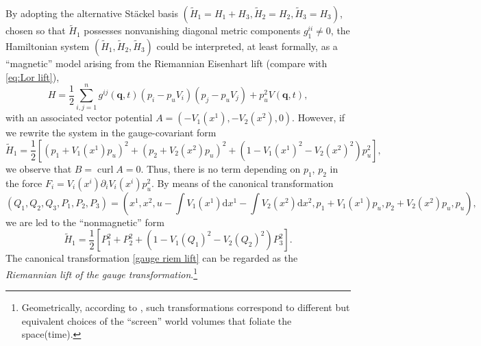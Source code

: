 \documentclass[10pt]{amsart}
\numberwithin{equation}{section}
\newcommand{\bs}{\boldsymbol}
\theoremstyle{definition}
\begin{document}
By adopting the alternative St\"ackel basis $(\tilde{H}_1=H_1+H_3,\tilde{H}_2=H_2,\tilde{H}_3=H_3)$, chosen so that $\tilde{H}_1$ possesses nonvanishing diagonal metric components $g^{ii}_1\neq0$, the Hamiltonian system $(\tilde{H}_1,\tilde{H}_2,\tilde{H}_3)$ could be interpreted, at least formally, as a ``magnetic'' model arising from the Riemannian Eisenhart lift (compare with \eqref{eq:Lor lift}),
	\begin{equation}
		H= \frac{1}{2}\sum_{i,j=1}^{n} g^{ij}(\bs{q},t) (p_i -p_u V_i)(p_j- p_u V_j) + p_u^2 V(\bs{q},t),
	\end{equation}
	with an associated vector potential $A=(-V_1(x^1),-V_2(x^2),0)$.
	However, if we rewrite the system in the gauge-covariant form
	\begin{equation}
		\tilde{H}_1= \frac{1}{2}\left[(p_1+V_1(x^1) p_u)^2+(p_2+V_2(x^2)p_u)^2+(1-V_1(x^1)^2-V_2(x^2)^2)p_u^2\right],
	\end{equation}
	we observe that $B=\operatorname{curl} A=0$. Thus, there is no  term depending on $p_1$, $p_2$ in the force
	$F_i=V_i(x^i) \partial_{i}V_i(x^i)p_u^2$. By means of the canonical transformation
	\begin{equation}\label{gauge riem lift}
		(Q_1,Q_2,Q_3,P_1,P_2,P_3)=(x^1,x^2,u-\int V_1(x^1)\mathrm{d}x^1-\int V_2(x^2)\mathrm{d}x^2,p_1+V_1(x^1) p_u,p_2+V_2(x^2)p_u,p_u),
	\end{equation}
	we are led to the ``nonmagnetic'' form
	\begin{equation}
		\tilde{H}_1= \frac{1}{2}\left[P_1^2+P_2^2+(1-V_1(Q_1)^2-V_2(Q_2)^2)P_3^2\right].
	\end{equation}
	The canonical transformation \eqref{gauge riem lift} can be regarded as the \textit{Riemannian lift of the gauge transformation}.\footnote{Geometrically, according to \cite{BM2013PRD}, such transformations correspond to different but equivalent choices of the ``screen'' world volumes that foliate the space(time).}
	
\end{document}
